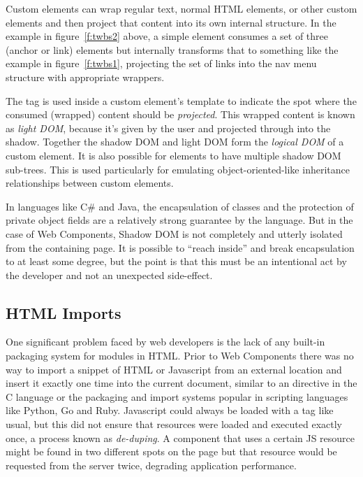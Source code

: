 Custom elements can wrap regular text, normal HTML elements, or other custom elements and then project that content into its own internal structure.
In the example in figure~\ref{f:twbs2} above, a simple  element consumes a set of three  (anchor or link) elements
but internally transforms that to something like the example in figure~\ref{f:twbs1}, 
projecting the set of links into the nav menu structure with appropriate wrappers.

The  tag is used inside a custom element's template to indicate the spot where the consumed (wrapped) content should be \textit{projected}. 
This wrapped content is known as \textit{light DOM}, because it's given by the user and projected through into the shadow.
Together the shadow DOM and light DOM form the \textit{logical DOM} of a custom element.
It is also possible for elements to have multiple shadow DOM sub-trees. 
This is used particularly for emulating object-oriented-like inheritance relationships between custom elements.

In languages like C\# and Java, the encapsulation of classes and the protection of private object fields are a relatively strong guarantee by the language.
But in the case of Web Components, Shadow DOM is not completely and utterly isolated from the containing page.
It is possible to ``reach inside'' and break encapsulation to at least some degree, 
but the point is that this must be an intentional act by the developer and not an unexpected side-effect.

\subsection{HTML Imports}
One significant problem faced by web developers is the lack of any built-in packaging system for modules in HTML.
Prior to Web Components there was no way to import a snippet of HTML or Javascript from an external location and insert it exactly one time into the current document, similar to an  directive in the C language or the packaging and import systems popular in scripting languages like Python, Go and Ruby. 
Javascript could always be loaded with a  tag like usual, but this did not ensure that resources were loaded and executed exactly once, a process known as \textit{de-duping}.
A component that uses a certain JS resource might be found in two different spots on the page but that resource would be requested from the server twice, degrading application performance.

